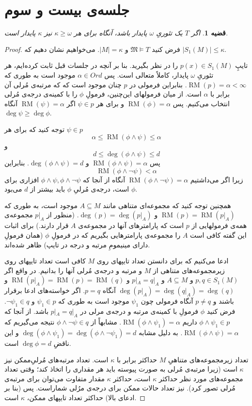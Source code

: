 \documentclass[12pt,a4paper]{report}
\theoremstyle{colorhead}
\newtheorem{thm}{قضیه}
\DeclareMathOperator{\RM}{RM}
\begin{document}
\section{جلسه‌ی بیست و سوم}
\begin{thm}
	اگر 
	$T$
	یک تئوریِ
	$\omega$
	پایدار باشد، آنگاه برای هر
$\kappa\geq \omega$
نیز
$\kappa$
پایدار است.
	\end{thm}
\begin{proof}
	فرض کنید
	$\mathfrak{M}\models T$
	و
	$|M|=\kappa$.
	می‌خواهیم نشان دهیم که
	$|S_1(M)|\leq \kappa$.
	\par 
	تایپِ
	$p(x)\in S_1(M)$
	را در نظر بگیرید.
	بنا بر آنچه در جلسات قبل ثابت کرده‌ایم، هر تئوریِ
	$\omega$
	پایدار، کاملاً متعالی است.  پس
$\alpha\in Ord$
موجود است به طوری که
	$\RM(p)=\alpha<\infty$.
	بنابراین فرمولی 
در
$p$
چنان موجود است که 
که مرتبه‌ی مُرلی آن برابر با
$\alpha$
است. از میان فرمولهای این‌‌چنین، فرمولِ 
$\phi$
را با کمینه‌ی درجه‌ی مُرلی انتخاب می‌کنیم. پس
$\RM(\phi)=\alpha$
و برای هر
$\psi\in p$
اگر
$\RM (\psi)=\alpha$
آنگاه
$\deg \psi \geq \deg \phi$.
\par 
توجه کنید که برای هر
$\psi\in p$
\[
\alpha\leq \RM(\phi\wedge \psi)\leq \alpha
\]
و
\[
d\leq \deg (\phi\wedge \psi)\leq d
\]
پس
$\RM(\phi\wedge\psi)=\alpha$
و
$\deg (\phi\wedge \psi)=d$.
بنابراین
\[
\RM(\phi\wedge\neg \psi)<\alpha
\]
زیرا اگر
می‌داشتیم
$\RM(\phi\wedge\neg \psi)=\alpha$
آنگاه از آنجا که 
$\phi\wedge \psi,\phi\wedge\neg \psi$
افزاری برای
$\phi$
است، درجه‌ی مُرلیِ
$\phi$
باید بیشتر از
$d$
می‌بود. 
\par 
همچنین توجه کنید که مجموعه‌ای متناهی مانند
$A\subseteq M$
موجود است، به طوری که
$\RM(p)=\RM(p|_A)$
و
$\deg(p)=\deg (p|_A)$.
(منظور از
$p|_A$
مجموعه‌ی همه‌ی فرمولهایی از
$p$
است که پارامترهای آنها در مجموعه‌ی
$A$
قرار دارند.) برای اثبات این گفته کافی است 
$A$
را مجموعه‌ی پارامترهایی بگیریم که در فرمولِ
$\phi$
(همان فرمولِ دارای مینیمومِ مرتبه و درجه در تایپ) ظاهر شده‌اند. 
\par 
ادعا می‌کنیم که برای دانستن تعداد تایپهای روی 
$M$
کافی است تعداد تایپهای روی زیرمجموعه‌های متناهی از
$M$
و مرتبه‌ و درجه‌ی مُرلی آنها را بدانیم. در واقع اگر
$p,q\in S_1(M)$
و 
$A\subseteq M$
و
$p|_A=q|_A$
و 
$\RM(p|_A)=\RM(p)=\RM(q)$
و
\mbox{$\deg(p|_A)=\deg(q|_A)=\deg(q)$}
آنگاه
$p=q$.
اگر خواسته‌های ادعا برقرار باشند و
$p\not=q$
آنگاه فرمولی چون
$\psi_1$
موجود است به طوری که
$\psi_1\in p$
و
$\neg \psi_1\in q$.
فرض کنید
$\phi$
فرمولِ با کمینه‌ی مرتبه و درجه‌ی مرلی در
$p|_A=q|_A$
باشد. 
از آنجا که 
$\phi\wedge\psi_1\in p$
داریم
$\RM(\phi\wedge \psi_1)=\alpha$.
مشابهاً 
از
$\phi\wedge\neg \psi\in q$
نتیجه می‌گیریم که
$\RM(\phi\wedge\psi)=\alpha$.
به دلیل مشابه
$\deg (\phi\wedge\psi_1)=\deg (\phi\wedge\neg\psi_1)=d$
و این ناقضِ
$\deg\phi=d$
است. 
\par 
تعداد زیرمجموعه‌های متناهیِ
$M$
حداکثر برابر با
$\kappa$
است. تعداد مرتبه‌های مُرلیِ‌ممکن نیز 
$\kappa$
است (زیرا مرتبه‌ی مُرلی به صورت پیوسته باید هر مقداری را اتخاذ کند؛ وقتی تعداد مجموعه‌های مورد نظر حداکثر
$\kappa$
است، حداکثر
$\kappa$
مقدار متفاوت می‌توان برای مرتبه‌ی مُرلی تصور کرد). نیز تعداد حالات ممکن برای درجه‌ی مرُلی شماراست. پس (بنا بر ادعای بالا) حداکثر تعداد تایپهای ممکن،
$\kappa$
است. 
	\end{proof}
\end{document}
